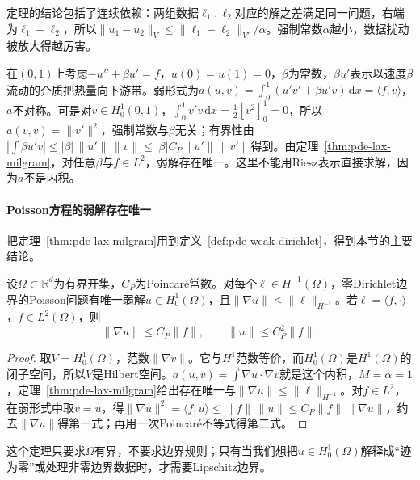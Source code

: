定理的结论包括了连续依赖：两组数据$\ell_1,\ell_2$对应的解之差满足同一问题，右端为$\ell_1-\ell_2$，所以$\|u_1-u_2\|_V\leq\|\ell_1-\ell_2\|_{V'}/\alpha$。强制常数$\alpha$越小，数据扰动被放大得越厉害。

\begin{example}[不对称的对流扩散问题]
\label{ex:pde-convection-diffusion}
在$(0,1)$上考虑$-u''+\beta u'=f$，$u(0)=u(1)=0$，$\beta$为常数，$\beta u'$表示以速度$\beta$流动的介质把热量向下游带。弱形式为$a(u,v)=\int_0^1(u'v'+\beta u'v)\,\mathrm dx=\langle f,v\rangle$，$a$不对称。可是对$v\in H_0^1(0,1)$，$\int_0^1v'v\,\mathrm dx=\tfrac12[v^2]_0^1=0$，所以$a(v,v)=\|v'\|^2$，强制常数与$\beta$无关；有界性由$|\int\beta u'v|\leq|\beta|\,\|u'\|\,\|v\|\leq|\beta|C_P\|u'\|\,\|v'\|$得到。由定理~\ref{thm:pde-lax-milgram}，对任意$\beta$与$f\in L^2$，弱解存在唯一。这里不能用Riesz表示直接求解，因为$a$不是内积。
\end{example}

\paragraph{Poisson方程的弱解存在唯一}
把定理~\ref{thm:pde-lax-milgram}用到定义~\ref{def:pde-weak-dirichlet}，得到本节的主要结论。

\begin{theorem}[Dirichlet问题的弱解]
\label{thm:pde-dirichlet-existence}
设$\Omega\subset\mathbb R^d$为有界开集，$C_P$为Poincaré常数。对每个$\ell\in H^{-1}(\Omega)$，零Dirichlet边界的Poisson问题有唯一弱解$u\in H_0^1(\Omega)$，且$\|\nabla u\|\leq\|\ell\|_{H^{-1}}$。若$\ell=\langle f,\cdot\rangle$，$f\in L^2(\Omega)$，则
\begin{equation}
  \|\nabla u\|\leq C_P\|f\|,\qquad\|u\|\leq C_P^2\|f\| .
  \label{eq:pde-poisson-energy-estimate}
\end{equation}
\end{theorem}

\begin{proof}
取$V=H_0^1(\Omega)$，范数$\|\nabla v\|$。它与$H^1$范数等价，而$H_0^1(\Omega)$是$H^1(\Omega)$的闭子空间，所以$V$是Hilbert空间。$a(u,v)=\int\nabla u\cdot\nabla v$就是这个内积，$M=\alpha=1$，定理~\ref{thm:pde-lax-milgram}给出存在唯一与$\|\nabla u\|\leq\|\ell\|_{H^{-1}}$。对$f\in L^2$，在弱形式中取$v=u$，得$\|\nabla u\|^2=\langle f,u\rangle\leq\|f\|\,\|u\|\leq C_P\|f\|\,\|\nabla u\|$，约去$\|\nabla u\|$得第一式；再用一次Poincaré不等式得第二式。
\end{proof}

这个定理只要求$\Omega$有界，不要求边界规则；只有当我们想把$u\in H_0^1(\Omega)$解释成“迹为零”或处理非零边界数据时，才需要Lipschitz边界。

